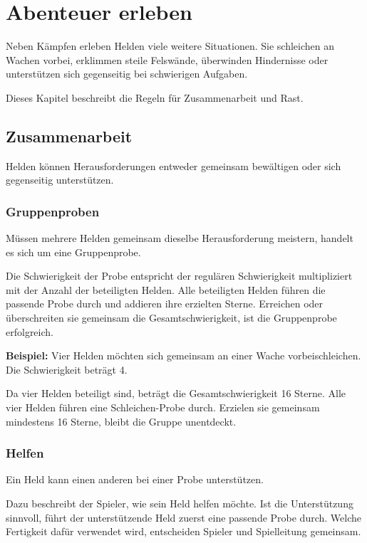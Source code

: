\chapter{Abenteuer erleben}

Neben Kämpfen erleben Helden viele weitere Situationen. Sie schleichen an Wachen vorbei, erklimmen steile Felswände, überwinden Hindernisse oder unterstützen sich gegenseitig bei schwierigen Aufgaben.

Dieses Kapitel beschreibt die Regeln für Zusammenarbeit und Rast.

\section{Zusammenarbeit}

Helden können Herausforderungen entweder gemeinsam bewältigen oder sich gegenseitig unterstützen.

\subsection{Gruppenproben}

Müssen mehrere Helden gemeinsam dieselbe Herausforderung meistern, handelt es sich um eine Gruppenprobe.

Die Schwierigkeit der Probe entspricht der regulären Schwierigkeit multipliziert mit der Anzahl der beteiligten Helden. Alle beteiligten Helden führen die passende Probe durch und addieren ihre erzielten Sterne. Erreichen oder überschreiten sie gemeinsam die Gesamtschwierigkeit, ist die Gruppenprobe erfolgreich.

\textbf{Beispiel:} Vier Helden möchten sich gemeinsam an einer Wache vorbeischleichen. Die Schwierigkeit beträgt 4.

Da vier Helden beteiligt sind, beträgt die Gesamtschwierigkeit 16 Sterne. Alle vier Helden führen eine Schleichen-Probe durch. Erzielen sie gemeinsam mindestens 16 Sterne, bleibt die Gruppe unentdeckt.

\subsection{Helfen}

Ein Held kann einen anderen bei einer Probe unterstützen.

Dazu beschreibt der Spieler, wie sein Held helfen möchte. Ist die Unterstützung sinnvoll, führt der unterstützende Held zuerst eine passende Probe durch. Welche Fertigkeit dafür verwendet wird, entscheiden Spieler und Spielleitung gemeinsam.

